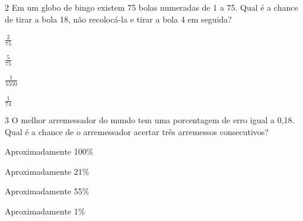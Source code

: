 \num{2} Em um globo de bingo existem 75 bolas numeradas de 1 a 75. Qual é a
chance de tirar a bola 18, não recolocá-la e tirar a bola 4 em seguida?

\begin{multicols}{4}
\begin{escolha}[itemsep=0pt]
\item $\frac{2}{75}$
\item $\frac{5}{75}$
\item $\frac{1}{5550}$
\item $\frac{1}{74}$
\end{escolha}
\end{multicols}



\num{3} O melhor arremessador do mundo tem uma porcentagem de erro igual a
0,18. Qual é a chance de o arremessador acertar três arremessos
consecutivos?

\begin{multicols}{2}
\begin{escolha}[itemsep=0pt]
\item Aproximadamente 100\%
\item Aproximadamente 21\%
\item Aproximadamente 55\%
\item Aproximadamente 1\%
\end{escolha}
\end{multicols}

